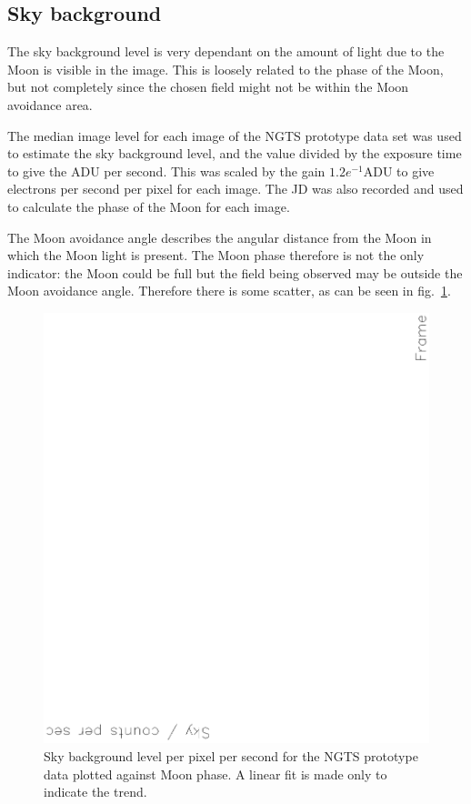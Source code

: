 \documentclass[11pt,a4paper]{report}
\begin{document}
\begin{appendices}
\section{Sky background}

The sky background level is very dependant on the amount of light due to
the Moon is visible in the image. This is loosely related to the phase
of the Moon, but not completely since the chosen field might not be
within the Moon avoidance area.

The median image level for each image of the NGTS prototype data set was
used to estimate the sky background level, and the value divided by the
exposure time to give the ADU per second. This was scaled by the gain
$1.2 e^{-1} \mathrm{ADU}$ to give electrons per second per pixel for
each image. The JD was also recorded and used to calculate the phase of
the Moon for each image. 

The Moon avoidance angle describes the angular distance from the Moon in
which the Moon light is present. The Moon phase therefore is not the
only indicator: the Moon could be full but the field being observed may
be outside the Moon avoidance angle. Therefore there is some scatter, as
can be seen in fig.~\ref{fig:skyvsmoon}.

\begin{figure}
    \begin{center}
        \includegraphics[angle=270,width=0.9\columnwidth]{images/skyvsmoon}
    \end{center}
    \caption{Sky background level per pixel per second for the NGTS
    prototype data plotted against Moon phase. A linear fit is made only to
indicate the trend.}
    \label{fig:skyvsmoon}
\end{figure}


\end{appendices}



\end{document}
